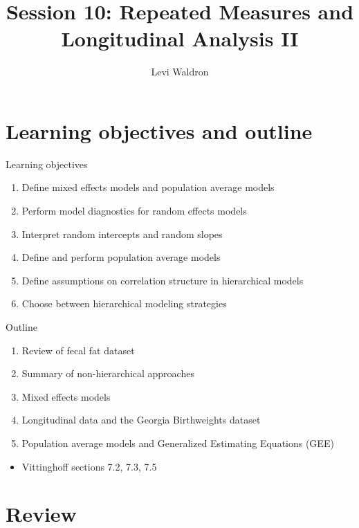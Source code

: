 \documentclass[
  ignorenonframetext,
]{beamer}
\title{Session 10: Repeated Measures and Longitudinal Analysis II}
\author{Levi Waldron}
\date{}
\institute{CUNY SPH Biostatistics 2}
\providecommand{\tightlist}{%
  \setlength{\itemsep}{0pt}\setlength{\parskip}{0pt}}
\begin{document}
\frame{\titlepage}

\hypertarget{learning-objectives-and-outline}{%
\section{Learning objectives and
outline}\label{learning-objectives-and-outline}}

\begin{frame}{Learning objectives}
\protect\hypertarget{learning-objectives}{}

\begin{enumerate}
\tightlist
\item
  Define mixed effects models and population average models
\item
  Perform model diagnostics for random effects models
\item
  Interpret random intercepts and random slopes
\item
  Define and perform population average models
\item
  Define assumptions on correlation structure in hierarchical models
\item
  Choose between hierarchical modeling strategies
\end{enumerate}

\end{frame}

\begin{frame}{Outline}
\protect\hypertarget{outline}{}

\begin{enumerate}
\tightlist
\item
  Review of fecal fat dataset
\item
  Summary of non-hierarchical approaches
\item
  Mixed effects models
\item
  Longitudinal data and the Georgia Birthweights dataset
\item
  Population average models and Generalized Estimating Equations (GEE)
\end{enumerate}

\begin{itemize}
\tightlist
\item
  Vittinghoff sections 7.2, 7.3, 7.5
\end{itemize}

\end{frame}

\hypertarget{review}{%
\section{Review}\label{review}}
\end{document}
